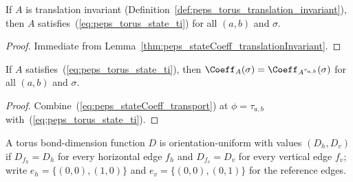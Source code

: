 \begin{lemma}%
    \label{thm:peps_tensor_translation_invariant_state}
    \leanok
    If $A$ is translation invariant (Definition~\ref{def:peps_torus_translation_invariant}),
    then $A$ satisfies~(\ref{eq:peps_torus_state_ti}) for all $(a,b)$ and $\sigma$.
\end{lemma}
\begin{proof}\leanok
    Immediate from Lemma~\ref{thm:peps_stateCoeff_translationInvariant}.
\end{proof}

\begin{lemma}%
    \label{thm:peps_sameState_translate_of_state_translation_invariant}
    \leanok
    If $A$ satisfies~(\ref{eq:peps_torus_state_ti}), then
    $\Coeff_A(\sigma)=\Coeff_{A^{\tau_{a,b}}}(\sigma)$ for all $(a,b)$ and $\sigma$.
\end{lemma}
\begin{proof}\leanok
    Combine~(\ref{eq:peps_stateCoeff_transport}) at $\phi=\tau_{a,b}$ with~(\ref{eq:peps_torus_state_ti}).
\end{proof}

\begin{definition}%
    \label{def:peps_torus_uniform_bond_dim}
    \leanok
    A torus bond-dimension function $D$ is orientation-uniform with values
    $(D_h,D_v)$ if $D_{f_h}=D_h$ for every horizontal edge $f_h$ and
    $D_{f_v}=D_v$ for every vertical edge $f_v$; write
    $e_h=\{(0,0),(1,0)\}$ and $e_v=\{(0,0),(0,1)\}$ for the reference edges.
\end{definition}


